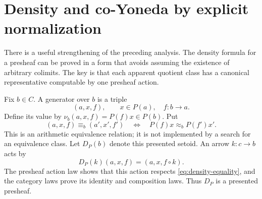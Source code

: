 \section{Density and co-Yoneda by explicit normalization}
\label{sec:density}

There is a useful strengthening of the preceding analysis.  The density
formula for a presheaf can be proved in a form that avoids assuming the
existence of arbitrary colimits.  The key is that each apparent quotient
class has a canonical representative computable by one presheaf action.

Fix $b\in C$.  A generator over $b$ is a triple
\[
 (a,x,f),\qquad x\in P(a),\quad f:b\to a.
\]
Define its value by $\nu_b(a,x,f)=P(f)x\in P(b)$.  Put
\begin{equation}
 (a,x,f)\equiv_b(a',x',f')
 \quad\Longleftrightarrow\quad
 P(f)x\approx_b P(f')x'.
 \label{eq:density-equality}
\end{equation}
This is an arithmetic equivalence relation; it is not implemented by a
search for an equivalence class.  Let $D_P(b)$ denote this presented setoid.
An arrow $k:c\to b$ acts by
\[
 D_P(k)(a,x,f)=(a,x,f\circ k).
\]
The presheaf action law shows that this action respects
\eqref{eq:density-equality}, and the category laws prove its identity and
composition laws.  Thus $D_P$ is a presented presheaf.

